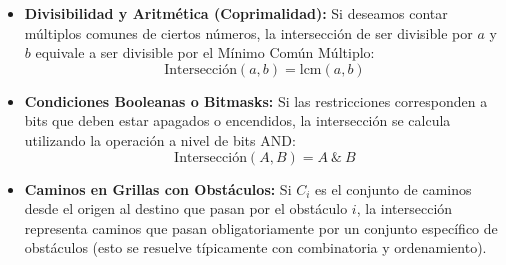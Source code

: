 \documentclass[11pt,a4paper]{article}
\begin{document}
\begin{itemize}
    \item \textbf{Divisibilidad y Aritmética (Coprimalidad):}
    Si deseamos contar múltiplos comunes de ciertos números, la intersección de ser divisible por $a$ y $b$ equivale a ser divisible por el Mínimo Común Múltiplo:
    \begin{equation}
        \text{Intersección}(a, b) = \text{lcm}(a, b)
    \end{equation}
    \item \textbf{Condiciones Booleanas o Bitmasks:}
    Si las restricciones corresponden a bits que deben estar apagados o encendidos, la intersección se calcula utilizando la operación a nivel de bits AND:
    \begin{equation}
        \text{Intersección}(A, B) = A \ \& \ B
    \end{equation}
    \item \textbf{Caminos en Grillas con Obstáculos:}
    Si $C_i$ es el conjunto de caminos desde el origen al destino que pasan por el obstáculo $i$, la intersección representa caminos que pasan obligatoriamente por un conjunto específico de obstáculos (esto se resuelve típicamente con combinatoria y ordenamiento).
\end{itemize}
\end{document}
